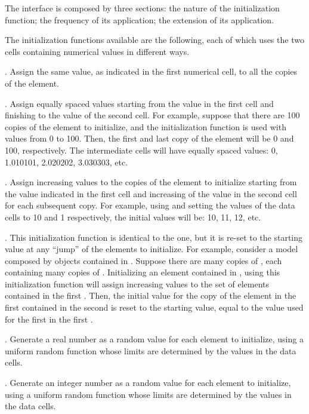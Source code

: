 \documentclass [11pt,a4paper] {book}
\begin{document}
The  interface is composed by three sections: the nature of the initialization function; the frequency of its application; the extension of its application.

The initialization functions available are the following, each of which uses the two cells containing numerical values in different ways.

. Assign the same value, as indicated in the first numerical cell, to all the copies of the element.

. Assign equally spaced values starting from the value in the first cell and finishing to the value of the second cell. For example, suppose that there are 100 copies of the element to initialize, and the initialization function  is used with values from 0 to 100. Then, the first and last copy of the element will be 0 and 100, respectively. The intermediate cells will have equally spaced values: 0, 1.010101, 2.020202, 3.030303, etc.

. Assign increasing values to the copies of the element to initialize starting from the value indicated in the first cell and increasing of the value in the second cell for each subsequent copy. For example, using  and setting the values of the data cells to 10 and 1 respectively, the initial values will be: 10, 11, 12, etc.

. This initialization function is identical to the  one, but it is re-set to the starting value at any ``jump'' of the elements to initialize. For example, consider a model composed by objects  contained in . Suppose there are many copies of , each containing many copies of . Initializing an element contained in , using this initialization function will assign increasing values to the set of elements contained in the first . Then, the initial value for the copy of the element in the first  contained in the second  is reset to the starting value, equal to the value used for the first  in the first . 

. Generate a real number as a random value for each element to initialize, using a uniform random function whose limits are determined by the values in the data cells.

. Generate an integer number as a random value for each element to initialize, using a uniform random function whose limits are determined by the values in the data cells.
\end{document}
